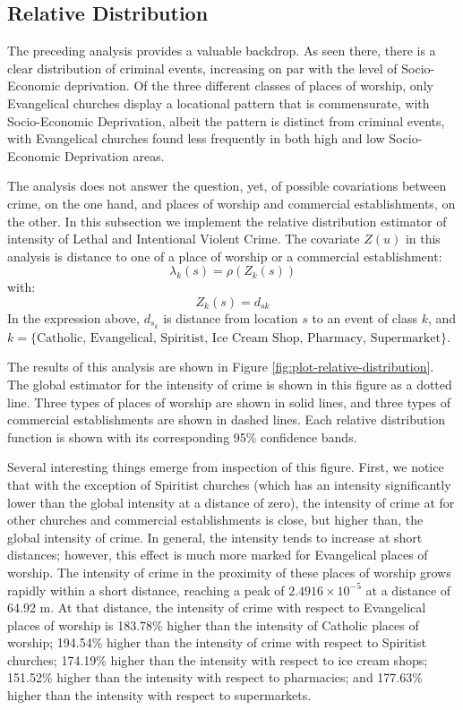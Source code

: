 \documentclass[smallextended]{svjour3}       %
\begin{document}
\hypertarget{relative-distribution}{%
\subsection{Relative Distribution}\label{relative-distribution}}

The preceding analysis provides a valuable backdrop. As seen there,
there is a clear distribution of criminal events, increasing on par with
the level of Socio-Economic deprivation. Of the three different classes
of places of worship, only Evangelical churches display a locational
pattern that is commensurate, with Socio-Economic Deprivation, albeit
the pattern is distinct from criminal events, with Evangelical churches
found less frequently in both high and low Socio-Economic Deprivation
areas.

The analysis does not answer the question, yet, of possible covariations
between crime, on the one hand, and places of worship and commercial
establishments, on the other. In this subsection we implement the
relative distribution estimator of intensity of Lethal and Intentional
Violent Crime. The covariate \(Z(u)\) in this analysis is distance to
one of a place of worship or a commercial establishment: \[
\lambda_k(s)=\rho(Z_k(s))
\] with: \[
Z_k(s) = d_{sk}
\] In the expression above, \(d_{s_k}\) is distance from location \(s\)
to an event of class \(k\), and
\(k=\{\text{Catholic, Evangelical, Spiritist, Ice Cream Shop, Pharmacy, Supermarket}\}\).

The results of this analysis are shown in Figure
\ref{fig:plot-relative-distribution}. The global estimator for the
intensity of crime is shown in this figure as a dotted line. Three types
of places of worship are shown in solid lines, and three types of
commercial establishments are shown in dashed lines. Each relative
distribution function is shown with its corresponding 95\% confidence
bands.

Several interesting things emerge from inspection of this figure. First,
we notice that with the exception of Spiritist churches (which has an
intensity significantly lower than the global intensity at a distance of
zero), the intensity of crime at for other churches and commercial
establishments is close, but higher than, the global intensity of crime.
In general, the intensity tends to increase at short distances; however,
this effect is much more marked for Evangelical places of worship. The
intensity of crime in the proximity of these places of worship grows
rapidly within a short distance, reaching a peak of
\ensuremath{2.4916\times 10^{-5}} at a distance of 64.92 m. At that
distance, the intensity of crime with respect to Evangelical places of
worship is 183.78\% higher than the intensity of Catholic places of
worship; 194.54\% higher than the intensity of crime with respect to
Spiritist churches; 174.19\% higher than the intensity with respect to
ice cream shops; 151.52\% higher than the intensity with respect to
pharmacies; and 177.63\% higher than the intensity with respect to
supermarkets.
\end{document}
